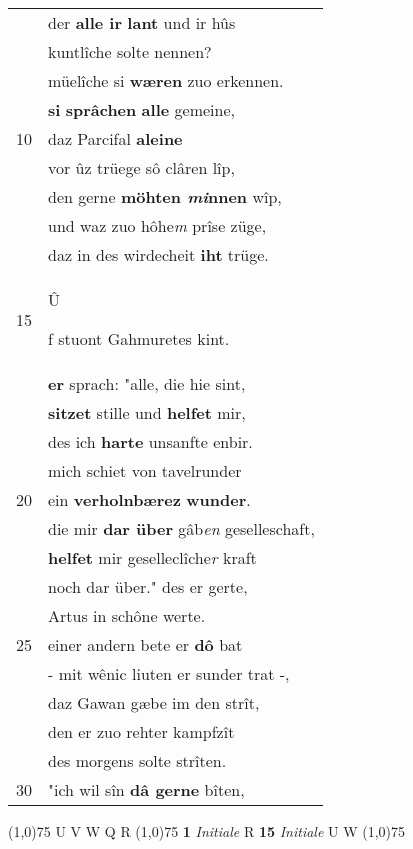 \documentclass[8pt,a4paper,notitlepage]{article}
\begin{document}
\begin{table}[ht]
\begin{minipage}[t]{0.5\linewidth}
\begin{tabular}{rl}
 & der \textbf{alle ir} \textbf{lant} und ir hûs\\ 
 & kuntlîche solte nennen?\\ 
 & müelîche si \textbf{wæren} zuo erkennen.\\ 
 & \textbf{si} \textbf{sprâchen} \textbf{alle} gemeine,\\ 
10 & daz Parcifal \textbf{aleine}\\ 
 & vor ûz trüege sô clâren lîp,\\ 
 & den gerne \textbf{möhten \textit{mi}nnen} wîp,\\ 
 & und waz zuo hôhe\textit{m} prîse züge,\\ 
 & daz in des wirdecheit \textbf{iht} trüge.\\ 
15 & \begin{large}Û\end{large}f stuont Gahmuretes kint.\\ 
 & \textbf{er} sprach: "alle, die hie sint,\\ 
 & \textbf{sitzet} stille und \textbf{helfet} mir,\\ 
 & des ich \textbf{harte} unsanfte enbir.\\ 
 & mich schiet von tavelrunder\\ 
20 & ein \textbf{verholnbærez} \textbf{wunder}.\\ 
 & die mir \textbf{dar über} gâb\textit{en} geselleschaft,\\ 
 & \textbf{helfet} mir geselleclîche\textit{r} kraft\\ 
 & noch dar über." des er gerte,\\ 
 & Artus in schône werte.\\ 
25 & einer andern bete er \textbf{dô} bat\\ 
 & - mit wênic liuten er sunder trat -,\\ 
 & daz Gawan gæbe im den strît,\\ 
 & den er zuo rehter kampfzît\\ 
 & des morgens solte strîten.\\ 
30 & "ich wil sîn \textbf{dâ gerne} bîten,\\ 
\end{tabular}
\scriptsize
\line(1,0){75} \newline
U V W Q R \newline
\line(1,0){75} \newline
\textbf{1} \textit{Initiale} R  \textbf{15} \textit{Initiale} U W  \newline
\line(1,0){75} \newline

\end{minipage}
\end{table}
\end{document}
